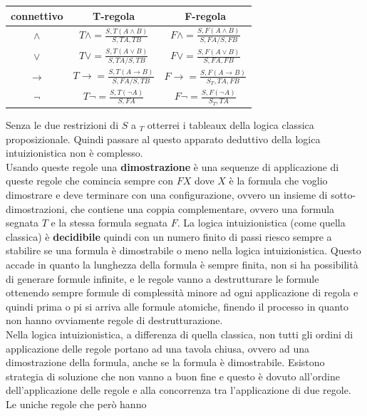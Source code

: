\documentclass[a4paper,12pt, oneside]{book}
\begin{document}
\begin{table}[H]
  \Large
  \centering
  \begin{tabular}{c||c|c}
    connettivo& T-regola& F-regola\\
    \hline
    \hline
    $\land$ & $T\land=\frac{S,T(A\land B)}{S,TA,TB}$&
                        $F\land=\frac{S,F(A\land B)}{S,FA/S,FB}$\\
    \hline
    $\lor$ & $T\lor=\frac{S,T(A\lor B)}{S,TA/S,TB}$&
                        $F\lor=\frac{S,F(A\lor B)}{S,FA,FB}$\\
    \hline
    $\to$ & $T\to=\frac{S,T(A\to B)}{S,FA/S,TB}$&
                        $F\to=\frac{S,F(A\to B)}{S_T,TA,FB}$\\
    \hline
    $\neg$ & $T\neg=\frac{S,T(\neg A)}{S,FA}$&
                        $F\neg=\frac{S,F(\neg A)}{S_T,TA}$\\
    \hline
  \end{tabular}
\end{table}
Senza le due restrizioni di $S$ a $_T$ otterrei i tableaux della logica classica
proposizionale. Quindi passare al questo apparato deduttivo della logica
intuizionistica non è complesso.\\
Usando queste regole una \textbf{dimostrazione} è una sequenze di applicazione
di queste regole che comincia sempre con $FX$ dove $X$ è la formula che voglio
dimostrare e deve terminare con una configurazione, ovvero un insieme di
sotto-dimostrazioni, che contiene una coppia complementare, ovvero una formula
segnata $T$ e la stessa formula segnata $F$. La logica intuizionistica (come 
quella classica) è \textbf{decidibile} quindi con un numero finito di passi
riesco sempre a stabilire se una formula è dimostrabile o meno nella logica
intuizionistica. Questo accade in quanto la lunghezza della formula è sempre
finita, non si ha possibilità di generare formule infinite, e le regole vanno a
destrutturare le formule ottenendo sempre formule di complessità minore ad ogni
applicazione di regola e quindi prima o pi si arriva alle formule atomiche,
finendo il processo in quanto non hanno ovviamente regole di destrutturazione.\\
Nella logica intuizionistica, a differenza di quella classica,
non tutti gli ordini di applicazione delle regole portano ad
una tavola chiusa, ovvero ad una dimostrazione della formula, anche se la
formula è dimostrabile. Esistono strategia di soluzione che non vanno a buon
fine e questo è dovuto all'ordine dell'applicazione delle regole e alla
concorrenza tra l'applicazione di due regole. Le uniche regole che però hanno
\end{document}
